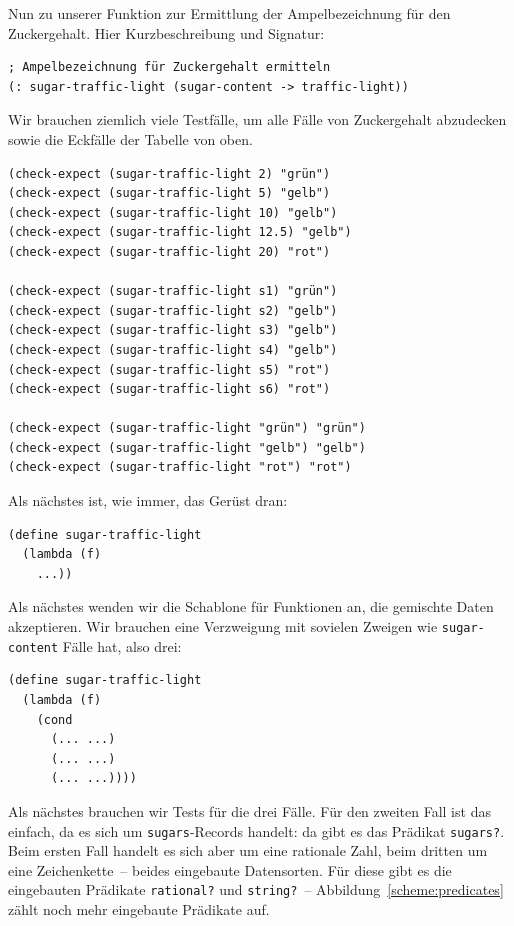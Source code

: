 Nun zu unserer Funktion zur Ermittlung der Ampelbezeichnung für den
Zuckergehalt.  Hier Kurzbeschreibung und Signatur:
%
\begin{verbatim}
; Ampelbezeichnung für Zuckergehalt ermitteln
(: sugar-traffic-light (sugar-content -> traffic-light))
\end{verbatim}
%
Wir brauchen ziemlich viele Testfälle, um alle Fälle von
Zuckergehalt abzudecken sowie die Eckfälle der Tabelle von oben.
%
\begin{verbatim}
(check-expect (sugar-traffic-light 2) "grün")
(check-expect (sugar-traffic-light 5) "gelb")
(check-expect (sugar-traffic-light 10) "gelb")
(check-expect (sugar-traffic-light 12.5) "gelb")
(check-expect (sugar-traffic-light 20) "rot")

(check-expect (sugar-traffic-light s1) "grün")
(check-expect (sugar-traffic-light s2) "gelb")
(check-expect (sugar-traffic-light s3) "gelb")
(check-expect (sugar-traffic-light s4) "gelb")
(check-expect (sugar-traffic-light s5) "rot")
(check-expect (sugar-traffic-light s6) "rot")

(check-expect (sugar-traffic-light "grün") "grün")
(check-expect (sugar-traffic-light "gelb") "gelb")
(check-expect (sugar-traffic-light "rot") "rot")
\end{verbatim}
%
Als nächstes ist, wie immer, das Gerüst dran:
%
\begin{verbatim}
(define sugar-traffic-light
  (lambda (f)
    ...))
\end{verbatim}         
%
Als nächstes wenden wir die Schablone für Funktionen an, die gemischte
Daten akzeptieren.  Wir brauchen eine Verzweigung mit sovielen Zweigen
wie \texttt{sugar-content} Fälle hat, also drei:
%
\begin{verbatim}
(define sugar-traffic-light
  (lambda (f)
    (cond
      (... ...)
      (... ...)
      (... ...))))
\end{verbatim}         
%
Als nächstes brauchen wir Tests für die drei Fälle.  Für den zweiten
Fall ist das einfach, da es sich um \texttt{sugars}-Records handelt:
da gibt es das Prädikat \texttt{sugars?}.  Beim ersten Fall handelt es
sich aber um eine rationale Zahl, beim dritten um eine Zeichenkette~--
beides eingebaute Datensorten.  Für diese gibt es die eingebauten
Prädikate \texttt{rational?} und \texttt{string?}~--
Abbildung~\ref{scheme:predicates} zählt noch mehr eingebaute
Prädikate auf.
%
